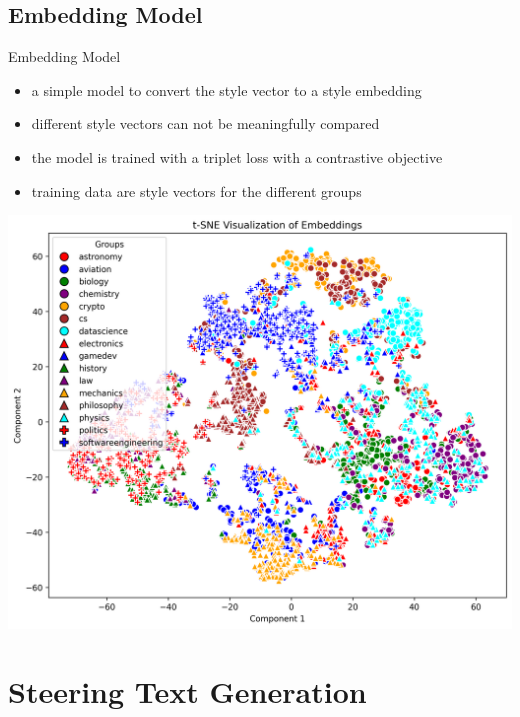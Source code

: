 \documentclass[]{beamer}
\begin{document}
\subsection{Embedding Model}
\begin{frame}{Embedding Model}
  \begin{itemize}
    \item a simple model to convert the style vector to a style embedding
    \item different style vectors can not be meaningfully compared
    \item the model is trained with a triplet loss with a contrastive objective
    \item training data are style vectors for the different groups
  \end{itemize}
\end{frame}

\begin{frame}[plain]
  \includegraphics[width=\linewidth]{img/t-SNE-embedding.png}
\end{frame}


\section{Steering Text Generation}
\end{document}
